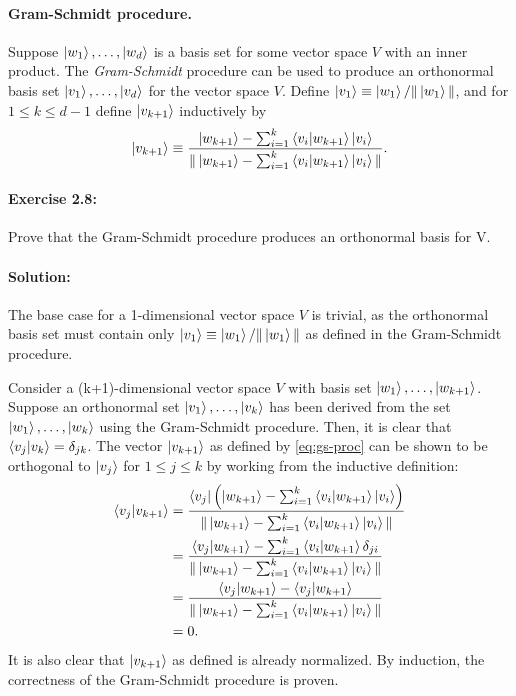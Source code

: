 \paragraph{Gram-Schmidt procedure.} Suppose $\ket{w_1}, \ldots, \ket{w_d}$ is a
basis set for some vector space $V$ with an inner product. The
\emph{Gram-Schmidt} procedure can be used to produce an orthonormal basis set
$\ket{v_1}, \ldots, \ket{v_d}$ for the vector space $V$. Define $\ket{v_1}
\equiv \ket{w_1}/\|\ket{w_1}\|$, and for $1 \leq k \leq d - 1$ define
$\ket{v_{k+1}}$ inductively by \begin{equation}
  \ket{v_{k+1}} \equiv \frac{\ket{w_{k+1}} - \sum_{i=1}^k \braket{v_i}{w_{k+1}}
  \ket{v_i}}{\|\ket{w_{k+1}} - \sum_{i=1}^k \braket{v_i}{w_{k+1}}\ket{v_i}\|}.
  \label{eq:gs-proc}
\end{equation}

\paragraph{\cite{mikeandike} Exercise 2.8:} Prove that the Gram-Schmidt
procedure produces an orthonormal basis for V.

\paragraph{Solution:} The base case for a 1-dimensional vector space $V$ is
trivial, as the orthonormal basis set must contain only $\ket{v_1} \equiv
\ket{w_1}/\|\ket{w_1}\|$ as defined in the Gram-Schmidt procedure.

Consider a (k+1)-dimensional vector space $V$ with basis set $\ket{w_1},
\ldots, \ket{w_{k+1}}$. Suppose an orthonormal set $\ket{v_1}, \ldots,
\ket{v_k}$ has been derived from the set $\ket{w_1}, \ldots, \ket{w_k}$ using
the Gram-Schmidt procedure. Then, it is clear that $\braket{v_j}{v_k} =
\delta_{jk}$. The vector $\ket{v_{k+1}}$ as defined by \eqref{eq:gs-proc} can
be shown to be orthogonal to $\ket{v_j}$ for $1 \leq j \leq k$ by working from
the inductive definition: \begin{align*}
  \braket{v_j}{v_{k+1}}
  &= \frac{\bra{v_j} \left(\ket{w_{k+1}} - \sum_{i=1}^k
  \braket{v_i}{w_{k+1}}\ket{v_i}\right)}{\|\ket{w_{k+1}} - \sum_{i=1}^k
  \braket{v_i}{w_{k+1}}\ket{v_i}\|} \\
  &= \frac{\braket{v_j}{w_{k+1}} - \sum_{i=1}^k \braket{v_i}{w_{k+1}}
  \delta_{ji}}{\|\ket{w_{k+1}} - \sum_{i=1}^k \braket{v_i}{w_{k+1}}
  \ket{v_i}\|} \\
  &= \frac{\braket{v_j}{w_{k+1}} - \braket{v_j}{w_{k+1}}}{\|\ket{w_{k+1}} -
  \sum_{i=1}^k \braket{v_i}{w_{k+1}}\ket{v_i}\|} \\
  &= 0.
\end{align*} It is also clear that $\ket{v_{k+1}}$ as defined is already
normalized. By induction, the correctness of the Gram-Schmidt procedure is
proven.

